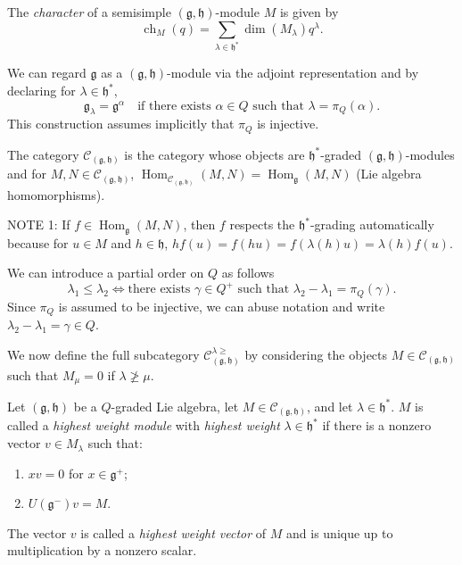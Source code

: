 \documentclass[a4paper, 12pt, reqno]{amsart}
\DeclareMathOperator{\ch}{ch}
\DeclareMathOperator{\Hom}{Hom}
\begin{document}
The \emph{character} of a semisimple $(\mathfrak{g}, \mathfrak{h})$-module $M$ is given by
\begin{equation*}
  \ch_M(q) = \sum_{\lambda \in \mathfrak{h}^*}\dim(M_{\lambda})q^{\lambda}.
\end{equation*}

We can regard $\mathfrak{g}$ as a $(\mathfrak{g}, \mathfrak{h})$-module via the adjoint representation and by declaring for $\lambda \in \mathfrak{h}^*$,
\begin{equation*}
  \mathfrak{g}_{\lambda} = \mathfrak{g}^{\alpha} \quad \text{if there exists $\alpha \in Q$ such that $\lambda = \pi_Q(\alpha)$}.
\end{equation*}
This construction assumes implicitly that $\pi_Q$ is injective.

The category $\mathcal{C}_{(\mathfrak{g}, \mathfrak{h})}$ is the category whose objects are $\mathfrak{h}^*$-graded $(\mathfrak{g}, \mathfrak{h})$-modules and for $M, N \in \mathcal{C}_{(\mathfrak{g}, \mathfrak{h})}$, $\Hom_{\mathcal{C}_{(\mathfrak{g}, \mathfrak{h})}}(M, N) = \Hom_{\mathfrak{g}}(M, N)$ (Lie algebra homomorphisms).

NOTE 1: If $f \in \Hom_{\mathfrak{g}}(M, N)$, then $f$ respects the $\mathfrak{h}^*$-grading automatically because for $u \in M$ and $h \in \mathfrak{h}$, $hf(u) = f(hu) = f(\lambda(h)u) = \lambda(h)f(u)$.

We can introduce a partial order on $Q$ as follows
\begin{equation*}
  \lambda_1 \le \lambda_2 \iff \text{there exists $\gamma \in Q^+$ such that $\lambda_2 - \lambda_1 = \pi_Q(\gamma)$.}
\end{equation*}
Since $\pi_Q$ is assumed to be injective, we can abuse notation and write $\lambda_2 - \lambda_1 = \gamma \in Q$.

We now define the full subcategory $\mathcal{C}^{\lambda \ge}_{(\mathfrak{g}, \mathfrak{h})}$ by considering the objects $M \in \mathcal{C}_{(\mathfrak{g}, \mathfrak{h})}$ such that $M_{\mu} = 0$ if $\lambda \ngeq \mu$.

Let $(\mathfrak{g}, \mathfrak{h})$ be a $Q$-graded Lie algebra, let $M \in \mathcal{C}_{(\mathfrak{g}, \mathfrak{h})}$, and let $\lambda \in \mathfrak{h}^*$.
$M$ is called a \emph{highest weight module} with \emph{highest weight} $\lambda \in \mathfrak{h}^*$ if there is a nonzero vector $v \in M_{\lambda}$ such that:
\begin{enumerate}
\item $xv = 0$ for $x \in \mathfrak{g}^+$;
\item $U(\mathfrak{g}^-)v = M$.
\end{enumerate}
The vector $v$ is called a \emph{highest weight vector} of $M$ and is unique up to multiplication by a nonzero scalar.
\end{document}
